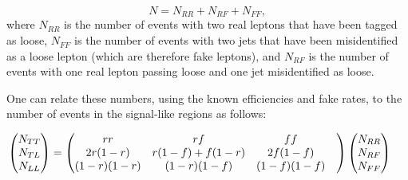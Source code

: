 



\begin{equation}
N = N_{RR} + N_{RF} + N_{FF},
\end{equation}
where $N_{RR}$ is the number of events with two real leptons that have been tagged as loose,
$N_{FF}$ is the number of events with two jets that have been misidentified as a loose lepton (which are therefore fake leptons),
and $N_{RF}$ is the number of events with one real lepton passing loose and one jet misidentified as loose.

One can relate these numbers, using the known efficiencies and fake rates, to the number of events in the signal-like regions as follows:

\begin{equation}
  \label{eqn:mm_matrix}
  \hspace{-0.5cm}
  \begin{pmatrix}N_{TT}\\N_{TL}\\N_{LL}\end{pmatrix} 
  = 
  \begin{pmatrix}rr& rf& ff\\ 2r(1-r)& r(1-f) + f(1-r)& 2f(1-f)\\ (1-r)(1-r) & (1-r)(1-f)& (1-f)(1-f)& \\\end{pmatrix}
  \begin{pmatrix}N_{RR}\\N_{RF}\\N_{FF}
  \end{pmatrix}
\end{equation}


